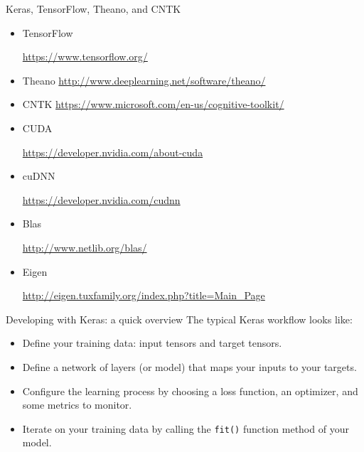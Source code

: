 \documentclass{beamer}
\begin{document}
\begin{frame}{Keras, TensorFlow, Theano, and CNTK}

\begin{itemize}
\item TensorFlow 

\url{https://www.tensorflow.org/}

\item Theano 
\url{http://www.deeplearning.net/software/theano/}

\item CNTK
{\small \url{https://www.microsoft.com/en-us/cognitive-toolkit/}}

\item CUDA 

\url{https://developer.nvidia.com/about-cuda}
\item cuDNN 

\url{https://developer.nvidia.com/cudnn}
\item Blas 

\url{http://www.netlib.org/blas/}
\item Eigen 

{\small \url{http://eigen.tuxfamily.org/index.php?title=Main_Page}}
\end{itemize}
\end{frame}

\begin{frame}{Developing with Keras: a quick overview}
The typical Keras workflow looks like:
\begin{itemize}
\item Define your training data: input tensors and target tensors.
\item Define a network of layers (or model) that maps your inputs to your targets.
\item Configure the learning process by choosing a loss function, an optimizer, and some metrics to monitor.
\item Iterate on your training data by calling the \texttt{fit()} function method of your model.
\end{itemize}
\end{frame}
\end{document}
